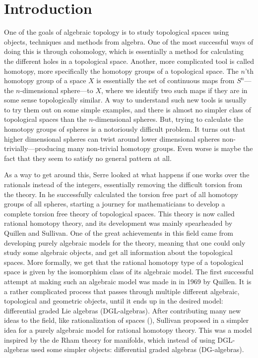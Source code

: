 


\section{Introduction}

One of the goals of algebraic topology is to study topological spaces using objects, techniques and methods from algebra. One of the most successful ways of doing this is through cohomology, which is essentially a method for calculating the different holes in a topological space. Another, more complicated tool is called homotopy, more specifically the homotopy groups of a topological space. The $n$'th homotopy group of a space $X$ is essentially the set of continuous maps from $S^n$---the $n$-dimensional sphere---to $X$, where we identify two such maps if they are in some sense topologically similar. A way to understand such new tools is usually to try them out on some simple examples, and there is almost no simpler class of topological spaces than the $n$-dimensional spheres. But, trying to calculate the homotopy groups of spheres is a notoriously difficult problem. It turns out that higher dimensional spheres can twist around lower dimensional spheres non-trivially---producing many non-trivial homotopy groups. Even worse is maybe the fact that they seem to satisfy no general pattern at all. 

As a way to get around this, Serre looked at what happens if one works over the rationals instead of the integers, essentially removing the difficult torsion from the theory. In \cite{Serre} he successfully calculated the torsion free part of all homotopy groups of all spheres, starting a journey for mathematicians to develop a complete torsion free theory of topological spaces. This theory is now called rational homotopy theory, and its development was mainly spearheaded by Quillen and Sullivan. One of the great achievements in this field came from developing purely algebraic models for the theory, meaning that one could only study some algebraic objects, and get all information about the topological spaces. More formally, we get that the rational homotopy type of a topological space is given by the isomorphism class of its algebraic model. The first successful attempt at making such an algebraic model was made in \cite{Quillen} in 1969 by Quillen. It is a rather complicated process that passes through multiple different algebraic, topological and geometric objects, until it ends up in the desired model: differential graded Lie algebras (DGL-algebras). 
After contributing many new ideas to the field, like rationalization of spaces (\cite{MIT}), Sullivan proposed in \cite{Sullivan} a simpler idea for a purely algebraic model for rational homotopy theory. This was a model inspired by the de Rham theory for manifolds, which instead of using DGL-algebras used some simpler objects: differential graded algebras (DG-algebras). 

